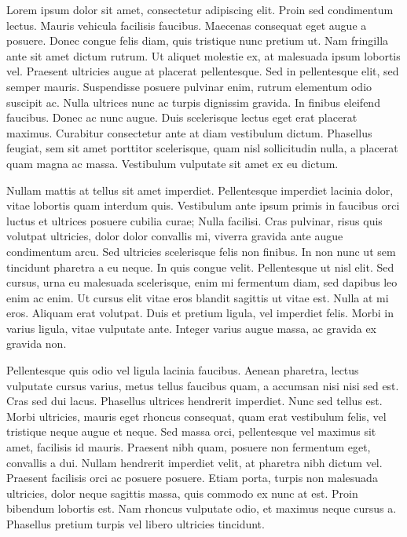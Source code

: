 Lorem ipsum dolor sit amet, consectetur adipiscing elit. Proin sed condimentum lectus. Mauris vehicula facilisis faucibus. Maecenas consequat eget augue a posuere. Donec congue felis diam, quis tristique nunc pretium ut. Nam fringilla ante sit amet dictum rutrum. Ut aliquet molestie ex, at malesuada ipsum lobortis vel. Praesent ultricies augue at placerat pellentesque. Sed in pellentesque elit, sed semper mauris. Suspendisse posuere pulvinar enim, rutrum elementum odio suscipit ac. Nulla ultrices nunc ac turpis dignissim gravida. In finibus eleifend faucibus. Donec ac nunc augue. Duis scelerisque lectus eget erat placerat maximus. Curabitur consectetur ante at diam vestibulum dictum. Phasellus feugiat, sem sit amet porttitor scelerisque, quam nisl sollicitudin nulla, a placerat quam magna ac massa. Vestibulum vulputate sit amet ex eu dictum.

Nullam mattis at tellus sit amet imperdiet. Pellentesque imperdiet lacinia dolor, vitae lobortis quam interdum quis. Vestibulum ante ipsum primis in faucibus orci luctus et ultrices posuere cubilia curae; Nulla facilisi. Cras pulvinar, risus quis volutpat ultricies, dolor dolor convallis mi, viverra gravida ante augue condimentum arcu. Sed ultricies scelerisque felis non finibus. In non nunc ut sem tincidunt pharetra a eu neque. In quis congue velit. Pellentesque ut nisl elit. Sed cursus, urna eu malesuada scelerisque, enim mi fermentum diam, sed dapibus leo enim ac enim. Ut cursus elit vitae eros blandit sagittis ut vitae est. Nulla at mi eros. Aliquam erat volutpat. Duis et pretium ligula, vel imperdiet felis. Morbi in varius ligula, vitae vulputate ante. Integer varius augue massa, ac gravida ex gravida non.

Pellentesque quis odio vel ligula lacinia faucibus. Aenean pharetra, lectus vulputate cursus varius, metus tellus faucibus quam, a accumsan nisi nisi sed est. Cras sed dui lacus. Phasellus ultrices hendrerit imperdiet. Nunc sed tellus est. Morbi ultricies, mauris eget rhoncus consequat, quam erat vestibulum felis, vel tristique neque augue et neque. Sed massa orci, pellentesque vel maximus sit amet, facilisis id mauris. Praesent nibh quam, posuere non fermentum eget, convallis a dui. Nullam hendrerit imperdiet velit, at pharetra nibh dictum vel. Praesent facilisis orci ac posuere posuere. Etiam porta, turpis non malesuada ultricies, dolor neque sagittis massa, quis commodo ex nunc at est. Proin bibendum lobortis est. Nam rhoncus vulputate odio, et maximus neque cursus a. Phasellus pretium turpis vel libero ultricies tincidunt.

